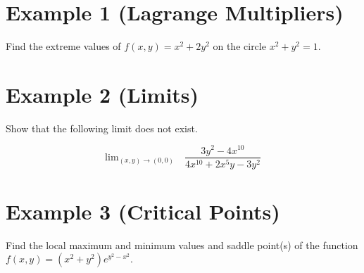 \documentclass[11pt]{article}
\begin{document}
\section*{Example 1 (Lagrange Multipliers)}

Find the extreme values of $f(x,y) = x^2 + 2y^2$ on the circle $x^2+y^2 = 1$. 

\section*{Example 2 (Limits)}

Show that the following limit does not exist.

$$\text{lim}_{(x,y) \rightarrow (0,0)}\quad \frac{3y^2-4x^{10}}{4x^{10} + 2x^5y - 3y^2}$$

\section*{Example 3 (Critical Points)}
Find the local maximum and minimum values and saddle point(s) of the function $f(x,y) = (x^2+y^2)e^{y^2-x^2}$.
\end{document}
